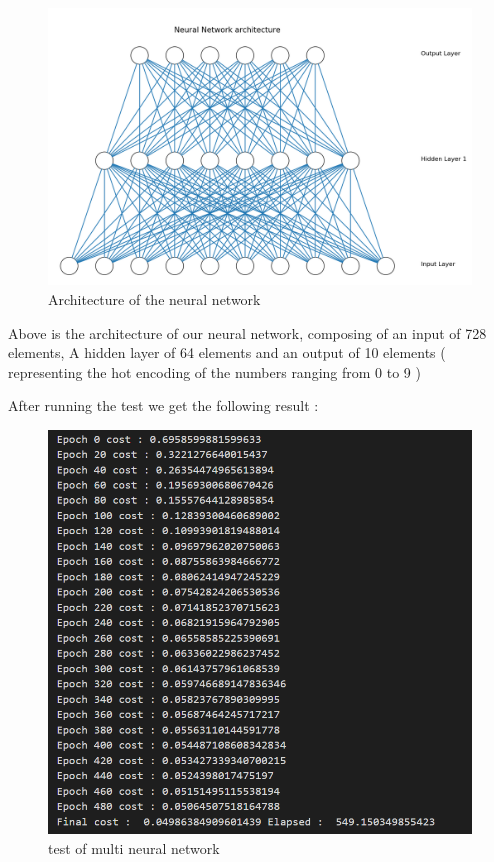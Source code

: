 \documentclass[a4paper,12pt,twoside]{report}
\begin{document}
\begin{figure}[H]
\centering
\includegraphics[scale = 0.6]{Figure_1.png}
\caption{Architecture of the neural network}
\end{figure}

Above is the architecture of our neural network, composing of an input of 728 elements, A hidden layer of 64 elements and an output of 10 elements ( representing the hot encoding of the numbers ranging from 0 to 9 )

After running the test we get the following result :

\begin{figure}[H]
\centering
\includegraphics[scale = 0.6]{lab2_3_cost_64.png}
\caption{test of multi neural network }
\end{figure}
\end{document}
